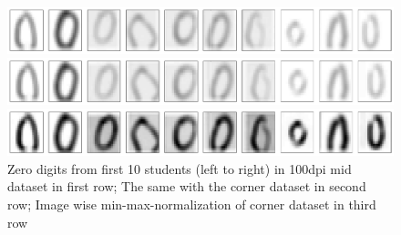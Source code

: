 \documentclass[conference]{IEEEtran}
\begin{document}
\begin{figure}[htbp]
    \centerline{\includegraphics[width=1.0\linewidth]{preprocessing/mid_withoutNorm.pdf}}
    \centerline{\includegraphics[width=1.0\linewidth]{preprocessing/corner_withoutNorm.pdf}}
    \centerline{\includegraphics[width=1.0\linewidth]{preprocessing/corner_withNorm.pdf}}
    \caption{\color{til}Zero digits from first 10 students (left to right) in 100dpi mid dataset in first row; The same with the corner dataset in second row; Image wise min-max-normalization of corner dataset in third row}
    \label{fig:dataset}
\end{figure}
\end{document}
